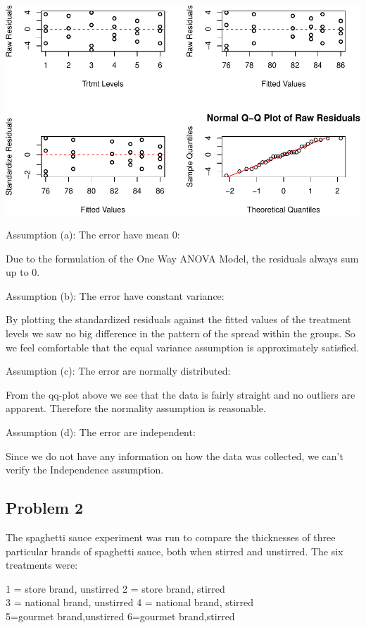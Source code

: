 \documentclass[12pt,]{article}
\begin{document}
\includegraphics{Markdown_HW_5_files/figure-latex/unnamed-chunk-5-1.pdf}

Assumption (a): The error have mean 0:

Due to the formulation of the One Way ANOVA Model, the residuals always
sum up to 0.

Assumption (b): The error have constant variance:

By plotting the standardized residuals against the fitted values of the
treatment levels we saw no big difference in the pattern of the spread
within the groups. So we feel comfortable that the equal variance
assumption is approximately satisfied.

Assumption (c): The error are normally distributed:

From the qq-plot above we see that the data is fairly straight and no
outliers are apparent. Therefore the normality assumption is reasonable.

Assumption (d): The error are independent:

Since we do not have any information on how the data was collected, we
can't verify the Independence assumption.

\subsection{Problem 2}\label{problem-2}

The spaghetti sauce experiment was run to compare the thicknesses of
three particular brands of spaghetti sauce, both when stirred and
unstirred. The six treatments were:

\begin{center}
1 = store brand, unstirred 2 = store brand, stirred\\
3 = national brand, unstirred 4 = national brand, stirred \\ 
5=gourmet brand,unstirred 6=gourmet brand,stirred
\end{center}
\end{document}
